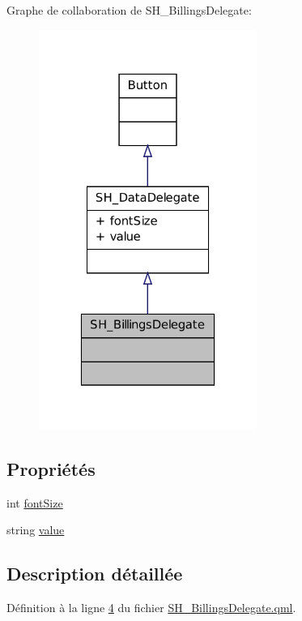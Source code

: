 Graphe de collaboration de S\-H\-\_\-\-Billings\-Delegate\-:\nopagebreak
\begin{figure}[H]
\begin{center}
\leavevmode
\includegraphics[width=202pt]{classSH__BillingsDelegate__coll__graph}
\end{center}
\end{figure}
\subsection*{Propriétés}
\begin{DoxyCompactItemize}
\item 
int \hyperlink{classSH__DataDelegate_afbb41ad9b513c7f27e7b5ad90d82e95b}{font\-Size}
\item 
string \hyperlink{classSH__DataDelegate_acb9da3c73493c88865e08d9575f26482}{value}
\end{DoxyCompactItemize}


\subsection{Description détaillée}


Définition à la ligne \hyperlink{SH__BillingsDelegate_8qml_source_l00004}{4} du fichier \hyperlink{SH__BillingsDelegate_8qml_source}{S\-H\-\_\-\-Billings\-Delegate.\-qml}.



